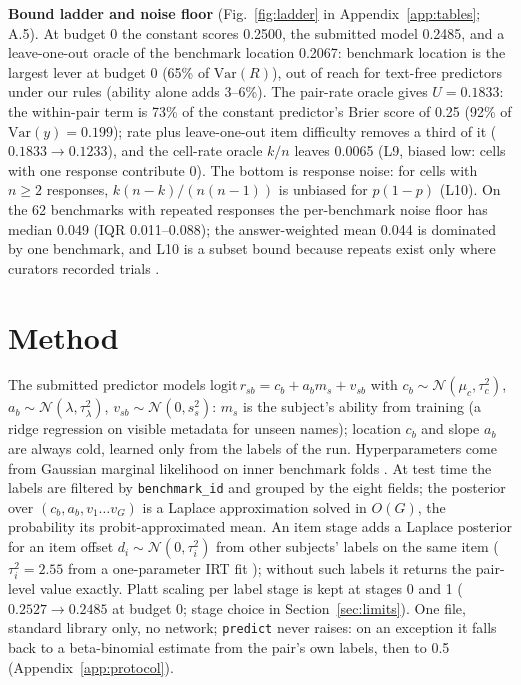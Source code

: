 \documentclass{article}
\begin{document}
\textbf{Bound ladder and noise floor} (Fig.~\ref{fig:ladder} in Appendix~\ref{app:tables}; A.5). At budget 0 the constant scores 0.2500, the
submitted model 0.2485, and a leave-one-out oracle of the benchmark location 0.2067: benchmark location is the largest
lever at budget 0 (65\% of $\mathrm{Var}(R)$), out of reach for text-free predictors under our rules (ability alone adds 3--6\%). The pair-rate
oracle gives $U = 0.1833$: the within-pair term is 73\% of the constant predictor's Brier score of 0.25 (92\% of
$\mathrm{Var}(y) = 0.199$); rate plus leave-one-out item difficulty removes a third of it ($0.1833 \to 0.1233$), and the cell-rate oracle $k/n$ leaves 0.0065 (L9, biased low: cells with one response contribute 0). The bottom is response noise: for cells with $n \ge 2$ responses,
$k(n-k)/(n(n-1))$ is unbiased for $p(1-p)$ (L10). On the 62 benchmarks with repeated responses the per-benchmark noise
floor has median 0.049 (IQR 0.011--0.088); the answer-weighted mean 0.044 is dominated by one benchmark, and L10 is a
subset bound because repeats exist only where curators recorded trials \citep[cf.][]{madaan2024variance,
miller2024errorbars, northcutt2021pervasive, gema2024mmlu}.

\section{Method}
\label{sec:method}

The submitted predictor models $\mathrm{logit}\, r_{sb} = c_b + a_b m_s + v_{sb}$ with $c_b \sim \mathcal{N}(\mu_c,
\tau_c^2)$, $a_b \sim \mathcal{N}(\lambda, \tau_\lambda^2)$, $v_{sb} \sim \mathcal{N}(0, s_s^2)$: $m_s$ is the subject's
ability from training (a ridge regression on visible metadata for unseen names); location $c_b$ and slope $a_b$ are
always cold, learned only from the labels of the run. Hyperparameters come from Gaussian marginal likelihood on inner
benchmark folds \citep{mackay1992evidence}. At test time the labels are filtered by \texttt{benchmark\_id} and grouped
by the eight fields; the posterior over $(c_b, a_b, v_1 \dots v_G)$ is a Laplace approximation solved in $O(G)$, the
probability its probit-approximated mean. An item stage adds a Laplace posterior for an item offset $d_i \sim
\mathcal{N}(0, \tau_i^2)$ from other subjects' labels on the same item ($\tau_i^2 = 2.55$ from a one-parameter IRT fit
\citep{lord1980irt, lalor2016irt}); without such labels it returns the pair-level value exactly. Platt scaling
\citep{platt1999probabilistic} per label stage is kept at stages 0 and 1 ($0.2527 \to 0.2485$ at budget 0; stage
choice in Section~\ref{sec:limits}). One file, standard library only, no network; \texttt{predict} never raises: on an
exception it falls back to a beta-binomial estimate from the pair's own labels, then to 0.5 (Appendix~\ref{app:protocol}).
\end{document}
